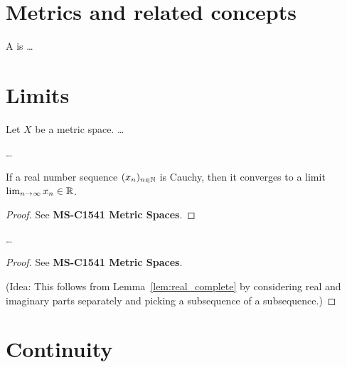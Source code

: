 \section{Metrics and related concepts}

\begin{definition}
  \label{def:ball}
  A  is \ldots
\end{definition}

\section{Limits}

\begin{definition}[Limit]
  \label{def:limit}
  Let $X$ be a metric space.
  \ldots
\end{definition}

\begin{definition}
  \label{def:cauchy_sequence}
  \ldots
\end{definition}

\begin{lemma}
  \label{lem:real_complete}
  If a real number sequence $(x_n)_{n \in \mathbb{N}}$ is Cauchy,
  then it converges to a limit $\lim_{n \to \infty} x_n \in \mathbb{R}$.
\end{lemma}
\begin{proof}
  See \textbf{MS-C1541 Metric Spaces}.
\end{proof}

\begin{lemma}
  \label{lem:complex_complete}
  \ldots
\end{lemma}
\begin{proof}
  See \textbf{MS-C1541 Metric Spaces}.

  (Idea: This follows from Lemma~\ref{lem:real_complete} by
  considering real and imaginary parts separately and picking
  a subsequence of a subsequence.)
\end{proof}

\section{Continuity}

